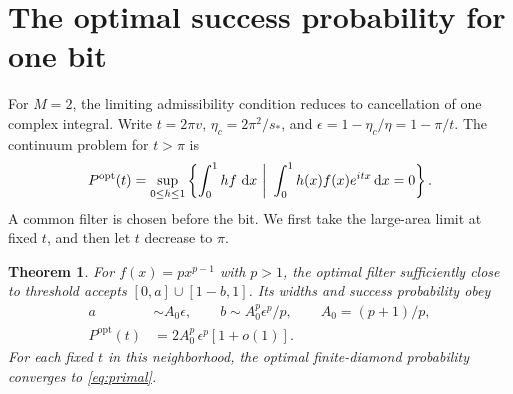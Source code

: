 \documentclass[11pt,letterpaper]{article}
\newtheorem{theorem}{Theorem}
\newcommand{\dd}{\mathop{}\!{\rm d}}
\newcommand{\sg}{s_*}
\newcommand{\Prob}{P^{\mathrm{opt}}}
\begin{document}
\section{The optimal success probability for one bit}
For $M=2$, the limiting admissibility condition reduces to cancellation of one complex integral. Write $t=2\pi v$, $\eta_c=2\pi^2/\sg$, and $\epsilon=1-\eta_c/\eta=1-\pi/t$. The continuum problem for $t>\pi$ is
\begin{equation}\label{eq:primal}
 \Prob(t)=\sup_{0\leq h\leq1}
 \left\{\int_0^1 h f\,\dd x\ \bigg|\ \int_0^1 h(x)f(x)e^{itx}\dd x=0\right\}.
\end{equation}
A common filter is chosen before the bit. We first take the large-area limit at fixed $t$, and then let $t$ decrease to $\pi$.

\begin{theorem}\label{th:power}
For $f(x)=p x^{p-1}$ with $p>1$, the optimal filter sufficiently close to threshold accepts $[0,a]\cup[1-b,1]$. Its widths and success probability obey
\begin{align}
 a&\sim A_0\epsilon,\qquad b\sim A_0^p\epsilon^p/p,\qquad A_0=(p+1)/p,\label{eq:width}\\
 \Prob(t)&=2 A_0^p\,\epsilon^p[1+o(1)]. \label{eq:power}
\end{align}
For each fixed $t$ in this neighborhood, the optimal finite-diamond probability converges to \eqref{eq:primal}.
\end{theorem}
\end{document}
